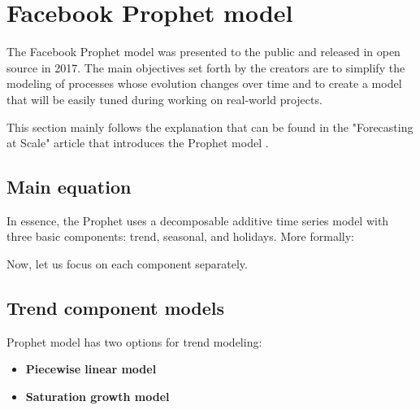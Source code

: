 \section{Facebook Prophet model}

The Facebook Prophet model was presented to the public and released in open source in 2017. The main objectives set forth by the creators are to simplify the modeling of processes whose evolution changes over time and to create a model that will be easily tuned during working on real-world projects.

This section mainly follows the explanation that can be found in the "Forecasting at Scale" article that introduces the Prophet model \cite{Taylor2018}.

\subsection{Main equation}

In essence, the Prophet uses a decomposable additive time series model with three basic components: trend, seasonal, and holidays. More formally:


Now, let us focus on each component separately.

\subsection{Trend component models} 
Prophet model has two options for trend modeling:
\begin{itemize}
    \item \textbf{Piecewise linear model}
    \item \textbf{Saturation growth model}
\end{itemize}


